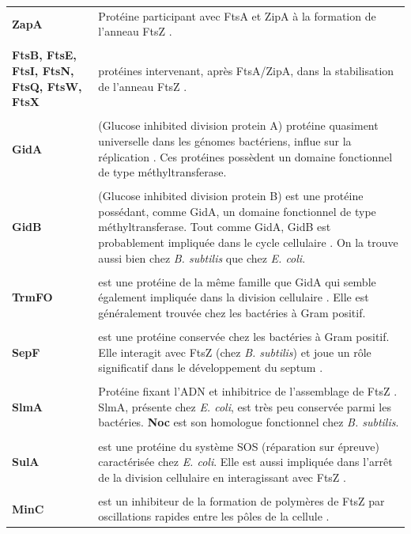 \begin{longtable}{@{\hspace{-2cm}\hspace{1cm}} >{\bfseries}p{} | >{\small}p{}}
	\\[-0.2cm]
	  ZapA & Protéine participant avec FtsA et ZipA à la formation de l'anneau FtsZ \citep{vicente2006septum}.\\
	\\[-0.2cm]
	 FtsB, FtsE, FtsI, FtsN, FtsQ, FtsW, FtsX & protéines intervenant, après FtsA/ZipA, dans la stabilisation de l'anneau FtsZ \citep{vicente2006septum}.\\
	\\[-0.2cm]
	 GidA & (Glucose inhibited division protein A) protéine quasiment universelle dans les génomes bactériens, influe sur la réplication \citep{kinscherf2002global}. Ces protéines possèdent un domaine fonctionnel de type méthyltransferase.\\
	\\[-0.2cm]
	 GidB & (Glucose inhibited division protein B) est une protéine possédant, comme GidA, un domaine fonctionnel de type méthyltransferase. Tout comme GidA, GidB est probablement impliquée dans le cycle cellulaire \citep{ogasawara1992genes}. On la trouve aussi bien chez \textit{B. subtilis} que chez \textit{E. coli}.\\
	\\[-0.2cm]
	 TrmFO & est une protéine de la même famille que GidA qui semble également impliquée dans la division cellulaire \citep{cicmil2008crystallization}. Elle est généralement trouvée chez les bactéries à Gram positif.\\
	\\[-0.2cm]
	 SepF & est une protéine conservée chez les bactéries à Gram positif. Elle interagit avec FtsZ (chez \textit{B. subtilis}) et joue un rôle significatif dans le développement du septum \citep{hamoen2006sepf}.\\
	\\[-0.2cm]
	SlmA & Protéine fixant l'ADN et inhibitrice de l'assemblage de FtsZ \citep{thanbichler2010}. SlmA, présente chez \textit{E. coli}, est très peu conservée parmi les bactéries. \textbf{Noc} est son homologue fonctionnel chez \textit{B. subtilis}.\\
	\\[-0.2cm]
	  SulA & est une protéine du système SOS (réparation sur épreuve) caractérisée chez \textit{E. coli}. Elle est aussi impliquée dans l'arrêt de la division cellulaire en interagissant avec FtsZ \citep{yamanaka1996identification}. \\ 
	\\[-0.2cm]
	 MinC & est un inhibiteur de la formation de polymères de FtsZ par oscillations rapides entre les pôles de la cellule \citep{thanbichler2010}. \\

\end{longtable}
